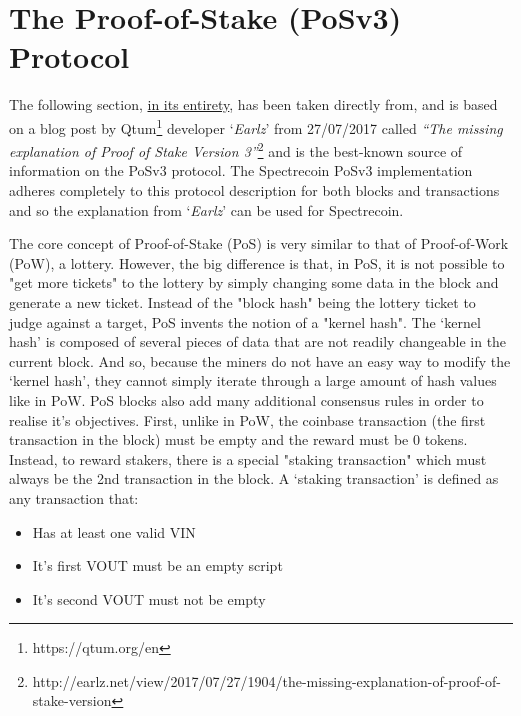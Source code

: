 \chapter{The Proof-of-Stake (PoSv3) Protocol}
The following section, \underline{in its entirety}, has been taken
directly from, and is based on a blog post by
Qtum\footnote{https://qtum.org/en} developer ‘\textit{Earlz}’
from 27/07/2017 called \textit{“The missing explanation of Proof
of Stake Version 3”}\footnote{http://earlz.net/view/2017/07/27/1904/the-missing-explanation-of-proof-of-stake-version}
and is the best-known source of information on the PoSv3 protocol.
The Spectrecoin PoSv3 implementation adheres completely to this protocol
description for both blocks and transactions and so the explanation from
‘\textit{Earlz}’ can be used for Spectrecoin.



The core concept of Proof-of-Stake (PoS) is very similar to that of
Proof-of-Work (PoW), a lottery. However, the big difference is that,
in PoS, it is not possible to "get more tickets" to the lottery by
simply changing some data in the block and generate a new ticket.
Instead of the "block hash" being the lottery ticket to judge against
a target, PoS invents the notion of a "kernel hash". The ‘kernel hash’
is composed of several pieces of data that are not readily changeable
in the current block. And so, because the miners do not have an easy
way to modify the ‘kernel hash’, they cannot simply iterate through a
large amount of hash values like in PoW. PoS blocks also add many
additional consensus rules in order to realise it's objectives. First,
unlike in PoW, the coinbase transaction (the first transaction in the
block) must be empty and the reward must be 0 tokens. Instead, to reward
stakers, there is a special "staking transaction" which must always be
the 2nd transaction in the block. A ‘staking transaction’ is defined as
any transaction that:


\begin{itemize}
	\item Has at least one valid VIN
	\item It's first VOUT must be an empty script
	\item It's second VOUT must not be empty
\end{itemize}



